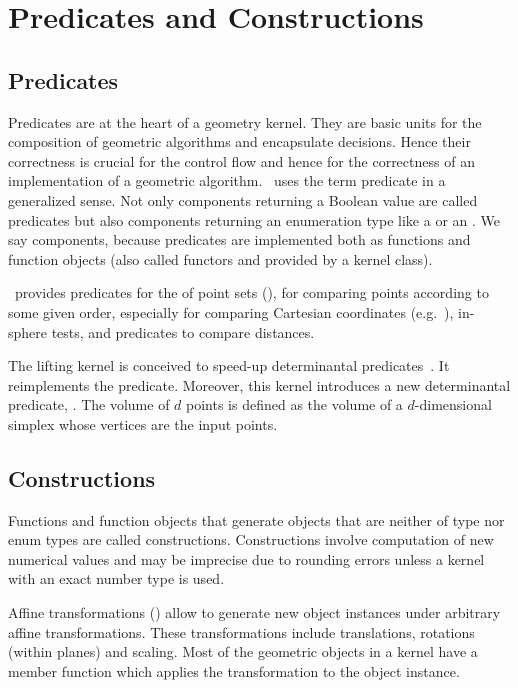 \section{Predicates and Constructions}

\subsection{Predicates}
Predicates are at the heart of a geometry kernel. They are basic units
for the composition of geometric algorithms and encapsulate
decisions.  Hence their correctness is crucial for the control flow
and hence for the correctness of an implementation of a geometric
algorithm. \cgal\ uses the term predicate in a generalized sense. Not
only components returning a Boolean value are called predicates but
also components returning an enumeration type like a
 or an .  We say components,
because predicates are implemented both as functions and function
objects (also called functors and provided by a kernel class).

\cgal\ provides predicates for the  of
point sets (), for comparing points according to some
given order, especially for comparing Cartesian coordinates
(e.g.~), in-sphere tests, and
predicates to compare distances.

The lifting kernel is conceived to speed-up determinantal
predicates~\cite{EFP12}. It reimplements the  predicate.
Moreover, this kernel introduces a new determinantal predicate,
. The volume of \(d\) points is defined as the volume of a
\(d\)-dimensional simplex whose vertices are the input points.

\subsection{Constructions}
Functions and function objects that generate objects that are neither
of type  nor enum types are called constructions.
Constructions involve computation of new numerical values and may be
imprecise due to rounding errors unless a kernel with an exact number
type is used.

Affine transformations () allow to
generate new object instances under arbitrary affine transformations.
These transformations include translations, rotations (within planes)
and scaling. Most of the geometric objects in a kernel have a member
function  which applies the
transformation to the object instance.

